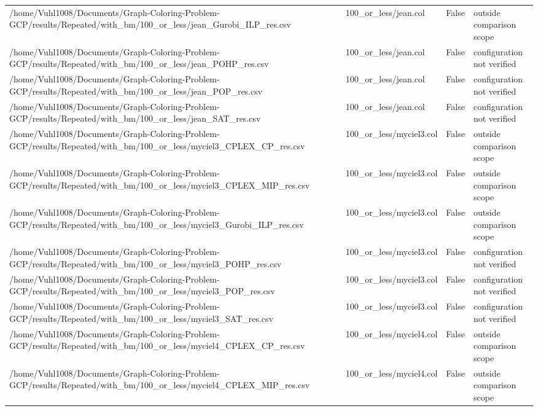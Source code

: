 \begin{table}[htbp]
\begin{tabular}{llll}
/home/Vuhl1008/Documents/Graph-Coloring-Problem-GCP/results/Repeated/with\_bm/100\_or\_less/jean\_Gurobi\_ILP\_res.csv & 100\_or\_less/jean.col & False & outside comparison scope \\
/home/Vuhl1008/Documents/Graph-Coloring-Problem-GCP/results/Repeated/with\_bm/100\_or\_less/jean\_POHP\_res.csv & 100\_or\_less/jean.col & False & configuration not verified \\
/home/Vuhl1008/Documents/Graph-Coloring-Problem-GCP/results/Repeated/with\_bm/100\_or\_less/jean\_POP\_res.csv & 100\_or\_less/jean.col & False & configuration not verified \\
/home/Vuhl1008/Documents/Graph-Coloring-Problem-GCP/results/Repeated/with\_bm/100\_or\_less/jean\_SAT\_res.csv & 100\_or\_less/jean.col & False & configuration not verified \\
/home/Vuhl1008/Documents/Graph-Coloring-Problem-GCP/results/Repeated/with\_bm/100\_or\_less/myciel3\_CPLEX\_CP\_res.csv & 100\_or\_less/myciel3.col & False & outside comparison scope \\
/home/Vuhl1008/Documents/Graph-Coloring-Problem-GCP/results/Repeated/with\_bm/100\_or\_less/myciel3\_CPLEX\_MIP\_res.csv & 100\_or\_less/myciel3.col & False & outside comparison scope \\
/home/Vuhl1008/Documents/Graph-Coloring-Problem-GCP/results/Repeated/with\_bm/100\_or\_less/myciel3\_Gurobi\_ILP\_res.csv & 100\_or\_less/myciel3.col & False & outside comparison scope \\
/home/Vuhl1008/Documents/Graph-Coloring-Problem-GCP/results/Repeated/with\_bm/100\_or\_less/myciel3\_POHP\_res.csv & 100\_or\_less/myciel3.col & False & configuration not verified \\
/home/Vuhl1008/Documents/Graph-Coloring-Problem-GCP/results/Repeated/with\_bm/100\_or\_less/myciel3\_POP\_res.csv & 100\_or\_less/myciel3.col & False & configuration not verified \\
/home/Vuhl1008/Documents/Graph-Coloring-Problem-GCP/results/Repeated/with\_bm/100\_or\_less/myciel3\_SAT\_res.csv & 100\_or\_less/myciel3.col & False & configuration not verified \\
/home/Vuhl1008/Documents/Graph-Coloring-Problem-GCP/results/Repeated/with\_bm/100\_or\_less/myciel4\_CPLEX\_CP\_res.csv & 100\_or\_less/myciel4.col & False & outside comparison scope \\
/home/Vuhl1008/Documents/Graph-Coloring-Problem-GCP/results/Repeated/with\_bm/100\_or\_less/myciel4\_CPLEX\_MIP\_res.csv & 100\_or\_less/myciel4.col & False & outside comparison scope \\

\end{tabular}
\end{table}
